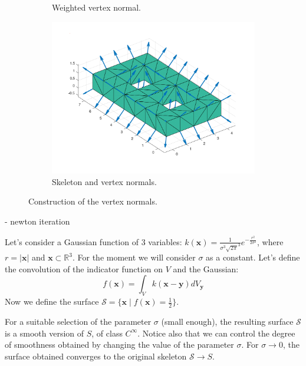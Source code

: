 \documentclass[11pt]{article}
\newcommand\bx{\boldsymbol x}
\newcommand\by{\boldsymbol y}
\begin{document}
\begin{figure}[t]
\begin{subfigure}[b]{.3\linewidth}
    \caption{Weighted vertex normal.}
    \label{normalvert2}
  \end{subfigure}
  \hfill
  \begin{subfigure}[b]{.3\linewidth}
    \centering
    \includegraphics[width=\linewidth]{normal_vert_genus_2.pdf}%
    \caption{Skeleton and vertex normals.}
    \label{normalvert3}
  \end{subfigure}
  
  \caption{Construction of the vertex normals.}
  \label{fig:normalverts}
\end{figure}



- newton iteration




Let's consider a Gaussian function of 3 variables:
$k(\bx)=\frac{1}{\sigma^3\sqrt{2\pi}^3}e^{-\frac{r^2}{2\sigma^2}}$,
where $r=|\bx|$ and $\bx\subset \mathbb{R}^3$. For the moment we will
consider $\sigma$ as a constant.  Let's define the convolution of the
indicator function on $\mathit{V}$ and the Gaussian:
$$f(\bx)=\int_{V}k(\bx-\by)dV_{\by}$$
Now we define the surface $\mathcal{S}=\{\bx \mid f(\bx)=\frac{1}{2}\}$.

For a suitable selection of the parameter $\sigma$ (small enough), the
resulting surface $\mathcal{S}$ is a smooth version of $\mathit{S}$,
of class $C^{\infty}$. Notice also that we can control the degree of
smoothness obtained by changing the value of the parameter
$\sigma$. For $\sigma \rightarrow 0$, the surface obtained converges
to the original skeleton $\mathcal{S}\rightarrow \mathit{S}$.
\end{document}
